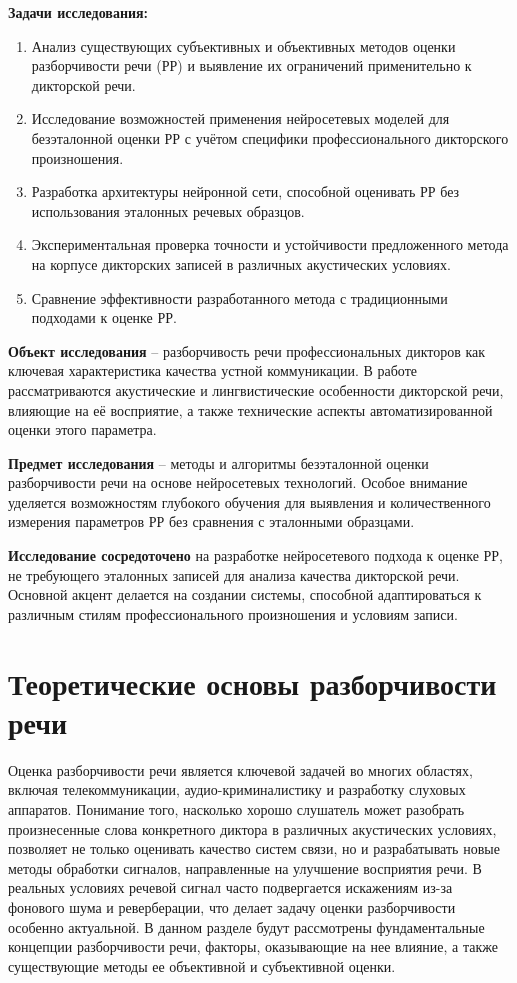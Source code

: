 \documentclass[oneside, final, 14pt]{extarticle}
\begin{document}
\textbf{Задачи исследования:}
\begin{enumerate}
\item Анализ существующих субъективных и объективных методов оценки разборчивости речи (РР) и выявление их ограничений применительно к дикторской речи.
\item Исследование возможностей применения нейросетевых моделей для безэталонной оценки РР с учётом специфики профессионального дикторского произношения.
\item Разработка архитектуры нейронной сети, способной оценивать РР без использования эталонных речевых образцов.
\item Экспериментальная проверка точности и устойчивости предложенного метода на корпусе дикторских записей в различных акустических условиях.
\item Сравнение эффективности разработанного метода с традиционными подходами к оценке РР.
\end{enumerate}

\textbf{Объект исследования} -- разборчивость речи профессиональных дикторов как ключевая характеристика качества устной коммуникации. В работе рассматриваются акустические и лингвистические особенности дикторской речи, влияющие на её восприятие, а также технические аспекты автоматизированной оценки этого параметра.

\textbf{Предмет исследования} -- методы и алгоритмы безэталонной оценки разборчивости речи на основе нейросетевых технологий. Особое внимание уделяется возможностям глубокого обучения для выявления и количественного измерения параметров РР без сравнения с эталонными образцами.

\textbf{Исследование сосредоточено} на разработке нейросетевого подхода к оценке РР, не требующего эталонных записей для анализа качества дикторской речи. Основной акцент делается на создании системы, способной адаптироваться к различным стилям профессионального произношения и условиям записи.

\newpage

\section{Теоретические основы разборчивости речи}

Оценка разборчивости речи является ключевой задачей во многих областях, включая телекоммуникации, аудио-криминалистику и разработку слуховых аппаратов. Понимание того, насколько хорошо слушатель может разобрать произнесенные слова конкретного диктора в различных акустических условиях, позволяет не только оценивать качество систем связи, но и разрабатывать новые методы обработки сигналов, направленные на улучшение восприятия речи. В реальных условиях речевой сигнал часто подвергается искажениям из-за фонового шума и реверберации, что делает задачу оценки разборчивости особенно актуальной. В данном разделе будут рассмотрены фундаментальные концепции разборчивости речи, факторы, оказывающие на нее влияние, а также существующие методы ее объективной и субъективной оценки.
\end{document}
